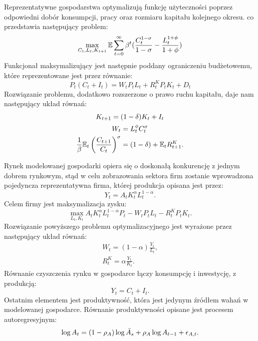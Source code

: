 Reprezentatywne gospodarstwa optymalizują funkcję użyteczności poprzez odpowiedni dobór konsumpcji, pracy oraz rozmiaru kapitału kolejnego okresu. co przedstawia następujący problem:
\begin{equation}
    \max_{C_{t}, L_{t}, K_{t+1}}\mathbb{E} \sum_{t=0}^{\infty} \beta^t(\frac{C^{1-\sigma}_{t}}{1-\sigma} - \frac{L^{1+\phi}_{t}}{1+\phi})
\end{equation}
Funkcjonał maksymalizujący jest następnie poddany ograniczeniu budżetowemu, które reprezentowane jest przez równanie:
\begin{equation}
    P_t(C_{t} + I_{t}) = W_t P_t L_{t} + R^K_t P_t K_{t} + D_t
\end{equation}
Rozwiązanie problemu, dodatkowo rozszerzone o prawo ruchu kapitału, daje nam następujący układ równań:
\begin{gather}
    K_{t+1} = (1-\delta)K_t + I_t \\
    W_t = L_t^{\phi} C_t^{\sigma}\\
    \frac{1}{\beta}\mathbb{E}_t\left(\frac{C_{t+1}}{C_t}\right)^\sigma = (1-\delta) + \mathbb{E}_t R^K_{t+1}.
\end{gather}

Rynek modelowanej gospodarki opiera się o doskonałą konkurencję z jednym dobrem rynkowym, stąd w celu zobrazowania sektora firm zostanie wprowadzona pojedyncza reprezentatywna firma, której produkcja opisana jest przez: 
\begin{equation}
    Y_{t} = A_t K_{t}^\alpha L^{1-\alpha}_{t}.
\end{equation}
Celem firmy jest maksymalizacja zysku:
\begin{equation}
    \max_{L_t, K_t} A_t K_{t}^\alpha L^{1-\alpha}_{t} P_t - W_t P_t L_t - R^K_t P_t K_t.
\end{equation}
Rozwiązanie powyższego problemu optymalizacyjnego jest wyrażone przez następujący układ równań:
\begin{gather}
    W_t = (1-\alpha)\frac{Y_t}{L_t},\\
    R^K_t = \alpha \frac{Y_t}{K_t}.
\end{gather}
Równanie czyszczenia rynku w gospodarce łączy konsumpcję i inwestycję, z produkcją:
\begin{equation}
    Y_t = C_t + I_t.
\end{equation}
Ostatnim elementem jest produktywność, która jest jedynym źródłem wahań w modelowanej gospodarce. Równanie produktywności opisane jest procesem autoregresyjnym:
\begin{equation}
    \log{A_t} = (1-\rho_A)\log{\bar{A}_s} + \rho_A \log{A_{t-1}} + \epsilon_{A,t}.
\end{equation}

